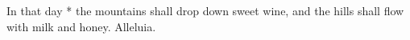 In that day * the mountains shall drop down sweet wine, and the hills shall flow with milk and honey. Alleluia.
